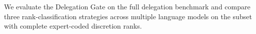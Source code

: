 %




%


%
%

We evaluate the Delegation Gate on the full delegation benchmark and
compare three rank-classification strategies across multiple language
models on the subset with complete expert-coded discretion ranks.

%
%

